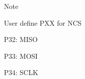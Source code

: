 \begin{DoxyNote}{Note}
\begin{DoxyItemize}
\item User define P\+XX for N\+CS~\newline

\item P32\+: M\+I\+SO~\newline

\item P33\+: M\+O\+SI~\newline

\item P34\+: S\+C\+LK~\newline

\end{DoxyItemize}
\end{DoxyNote}
